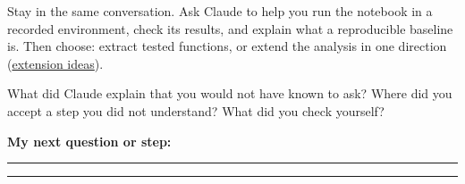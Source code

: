 Stay in the same conversation. Ask Claude to help you run the notebook in a recorded environment, check its results, and explain what a reproducible baseline is. Then choose: extract tested functions, or extend the analysis in one direction (\href{https://github.com/dowlinglab/claude-for-researchers/blob/main/resources/workshops/cstr/activities/workshop1_extensions.md}{extension ideas}).

What did Claude explain that you would not have known to ask? Where did you accept a step you did not understand? What did you check yourself?

\vfill
\textbf{My next question or step:}\par\vspace{8pt}\hrule\vspace{18pt}\hrule
